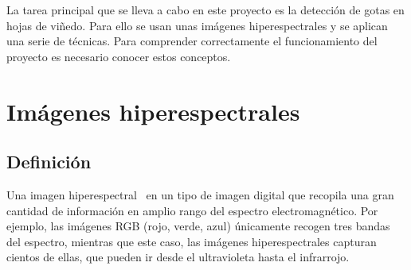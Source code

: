 
La tarea principal que se lleva a cabo en este proyecto es la detección de gotas en hojas de viñedo. Para ello se usan unas imágenes hiperespectrales y se aplican una serie de técnicas. Para comprender correctamente el funcionamiento del proyecto es necesario conocer estos conceptos.

\section{Imágenes hiperespectrales}

\subsection{Definición}
Una imagen hiperespectral~\cite{wiki:hiper} en un tipo de imagen digital que recopila una gran cantidad de información en amplio rango del espectro electromagnético. Por ejemplo, las imágenes RGB (rojo, verde, azul) únicamente recogen tres bandas del espectro, mientras que este caso, las imágenes hiperespectrales capturan cientos de ellas, que pueden ir desde el ultravioleta hasta el infrarrojo.


